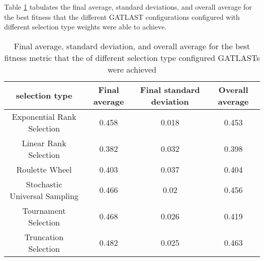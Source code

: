 Table \ref{tab:HP:GA:selectionMethod:best fitness} tabulates the final average, standard deviations, and overall average for the best fitness that the different GATLAST configurations configured with different selection type weights were able to achieve.
\begin{table}[tbh!]
\centering
\begin{adjustbox}{trim=0cm 0cm 0cm 0cm, clip=true}
\begin{tabular}{|c|c|c|c|}
\hline
selection type & Final average & Final standard deviation & Overall average\\
\hline
Exponential Rank Selection & 0.458 & 0.018 & 0.453\\\hline
Linear Rank Selection & 0.382 & 0.032 & 0.398\\\hline
Roulette Wheel & 0.403 & 0.037 & 0.404\\\hline
Stochastic Universal Sampling & 0.466 & 0.02 & 0.456\\\hline
Tournament Selection & 0.468 & 0.026 & 0.419\\\hline
Truncation Selection & 0.482 & 0.025 & 0.463\\\hline
\end{tabular}
\end{adjustbox}
\caption{Final average, standard deviation, and overall average for the best fitness metric that the of different selection type configured GATLASTs were achieved}
\label{tab:HP:GA:selectionMethod:best fitness}
\end{table}